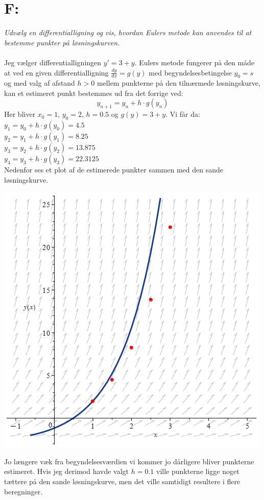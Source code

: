 \documentclass[a4paper, 11pt]{article}
\begin{document}
\section*{F:}
\textit{Udvælg en differentialligning og vis, hvordan Eulers metode kan anvendes til at bestemme punkter på løsningskurven.}\\\\
Jeg vælger differentialligningen \(y'=3+y\). Eulers metode fungerer på den måde at ved en given differentialligning \(\frac{dy}{dx}=g(y)\) med begyndelsesbetingelse \(y_0=s\) og med valg af afstand \(h>0\) mellem punkterne på den tilnærmede løsningskurve, kan et estimeret punkt bestemmes ud fra det forrige ved:
\[y_{n+1}=y_n+h\cdot g(y_n)\]
Her bliver \(x_0=1\), \(y_0=2\), \(h=0.5\) og \(g(y)=3+y\). Vi får da:\\
\(y_1=y_0+h\cdot g(y_0)=4.5\)\\
\(y_2=y_1+h\cdot g(y_1)=8.25\)\\
\(y_3=y_2+h\cdot g(y_2)=13.875\)\\
\(y_4=y_3+h\cdot g(y_3)=22.3125\)\\
Nedenfor ses et plot af de estimerede punkter sammen med den sande løsningskurve.
\begin{center}
    \includegraphics[width=0.6 \textwidth]{figur1.png}
\end{center}
Jo længere væk fra begyndelsesværdien vi kommer jo dårligere bliver punkterne estimeret. 
Hvis jeg derimod havde valgt \(h=0.1\) ville punkterne ligge noget tættere på den sande løsningskurve, men det ville samtidigt resultere i flere beregninger.
\end{document}
